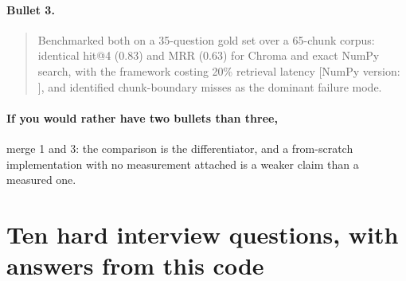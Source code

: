 \documentclass[11pt,a4paper]{article}
\begin{document}
\paragraph{Bullet 3.}
\begin{quote}
Benchmarked both on a 35-question gold set over a 65-chunk corpus: identical
hit@4 (0.83) and MRR (0.63) for Chroma and exact NumPy search, with the framework
costing 20\% retrieval latency [NumPy version: \underline{\quad\quad}], and
identified chunk-boundary misses as the dominant failure mode.
\end{quote}

\paragraph{If you would rather have two bullets than three,} merge 1 and 3: the
comparison is the differentiator, and a from-scratch implementation with no
measurement attached is a weaker claim than a measured one.

\section{Ten hard interview questions, with answers from this code}
\end{document}
